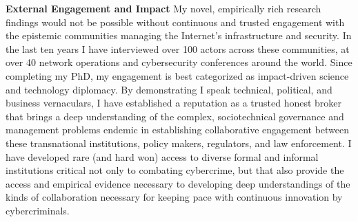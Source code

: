 \documentclass[11pt]{letter}
\begin{document}
\begin{letter}
  

\textbf{External Engagement and Impact} \vspace{0.2 \baselineskip} \newline %
%
My novel, empirically rich research findings would not be possible without continuous and trusted engagement with the epistemic communities managing the Internet's infrastructure and security.
%
In the last ten years I have interviewed over 100 actors across these communities, at over 40 network operations and cybersecurity conferences around the world.
%
%
%
%
Since completing my PhD, my engagement is best categorized as impact-driven science and technology diplomacy.
%
By demonstrating I speak technical, political, and business vernaculars, I have established a reputation as a trusted honest broker that brings a deep understanding of the complex, sociotechnical governance and management problems endemic in establishing collaborative engagement between these transnational institutions, policy makers, regulators, and law enforcement.
%
I have developed rare (and hard won) access to diverse formal and informal institutions critical not only to combating cybercrime, but that also provide the access and empirical evidence necessary to developing deep understandings of the kinds of collaboration necessary for keeping pace with continuous innovation by cybercriminals.
%



\end{letter}
\end{document}
